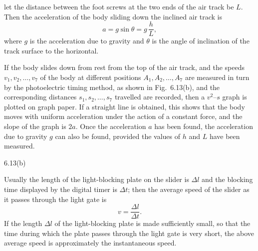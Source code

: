 \noindent let the distance between the foot screws at the two ends of the air track be $L$. Then the acceleration of the body sliding down the inclined air track is
\begin{equation}\tag{2}
a=g\sin\theta=g\,\frac{h}{L},
\end{equation}
where $g$ is the acceleration due to gravity and $\theta$ is the angle of inclination of the track surface to the horizontal.

If the body slides down from rest from the top of the air track, and the speeds $v_1,v_2,\dots,v_7$ of the body at different positions $A_1,A_2,\dots,A_7$ are measured in turn by the photoelectric timing method, as shown in Fig.~6.13(b), and the corresponding distances $s_1,s_2,\dots,s_7$ travelled are recorded, then a $v^{2}$--$s$ graph is plotted on graph paper. If a straight line is obtained, this shows that the body moves with uniform acceleration under the action of a constant force, and the slope of the graph is $2a$. Once the acceleration $a$ has been found, the acceleration due to gravity $g$ can also be found, provided the values of $h$ and $L$ have been measured.

\begin{figbox}{6.13(b)}
\end{figbox}

Usually the length of the light-blocking plate on the slider is $\Delta l$ and the blocking time displayed by the digital timer is $\Delta t$; then the average speed of the slider as it passes through the light gate is
\begin{equation*}
v=\frac{\Delta l}{\Delta t}.
\end{equation*}
If the length $\Delta l$ of the light-blocking plate is made sufficiently small, so that the time during which the plate passes through the light gate is very short, the above average speed is approximately the instantaneous speed.


